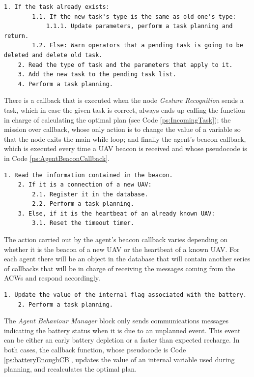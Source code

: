 \documentclass[fontsize=11pt, English=false, Español=true, Myfinal=true, twoside, numbers=noenddot]{scrbook}
\begin{document}
\begin{lstlisting}[caption={Task callback pseudocode}, breaklines=true, label=ps:IncomingTask]
	1. If the task already exists:
		1.1. If the new task's type is the same as old one's type:
			1.1.1. Update parameters, perform a task planning and return.
		1.2. Else: Warn operators that a pending task is going to be deleted and delete old task.
	2. Read the type of task and the parameters that apply to it.
	3. Add the new task to the pending task list.
	4. Perform a task planning.
\end{lstlisting}

There is a callback that is executed when the node \emph{Gesture Recognition} sends a task, which in case the given task is correct, always ends up calling the function in charge of calculating the optimal plan (see Code \ref{ps:IncomingTask}); the mission over callback, whose only action is to change the value of a variable so that the node exits the main while loop; and finally the agent's beacon callback, which is executed every time a \gls{UAV} beacon is received and whose pseudocode is in Code \ref{ps:AgentBeaconCallback}.

\begin{lstlisting}[caption={Agent's beacon callback}, breaklines=true, label=ps:AgentBeaconCallback]
	1. Read the information contained in the beacon.
	2. If it is a connection of a new UAV:
		2.1. Register it in the database.
		2.2. Perform a task planning.
	3. Else, if it is the heartbeat of an already known UAV:
		3.1. Reset the timeout timer.
\end{lstlisting}

The action carried out by the agent's beacon callback varies depending on whether it is the beacon of a new \gls{UAV} or the heartbeat of a known \gls{UAV}. For each agent there will be an object in the database that will contain another series of callbacks that will be in charge of receiving the messages coming from the \glspl{ACW} and respond accordingly.

\begin{lstlisting}[caption={Callback that runs when an \emph{Agent Behaviour Manager} sends battery feedback}, breaklines=true, label=ps:batteryEnoughCB]
	1. Update the value of the internal flag associated with the battery.
	2. Perform a task planning.
\end{lstlisting}

The \emph{Agent Behaviour Manager} block only sends communications messages indicating the battery status when it is due to an unplanned event. This event can be either an early battery depletion or a faster than expected recharge. In both cases, the callback function, whose pseudocode is Code \ref{ps:batteryEnoughCB}, updates the value of an internal variable used during planning, and recalculates the optimal plan.
\end{document}
